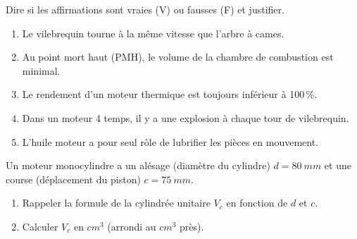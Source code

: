 \documentclass[11pt]{article}
\begin{document}
\begin{exercice}
Dire si les affirmations sont vraies (V) ou fausses (F) et justifier.
\begin{enumerate}
    \item Le vilebrequin tourne à la même vitesse que l'arbre à cames.
    \item Au point mort haut (PMH), le volume de la chambre de combustion est minimal.
    \item Le rendement d'un moteur thermique est toujours inférieur à 100\,\%.
    \item Dans un moteur 4 temps, il y a une explosion à chaque tour de vilebrequin.
    \item L'huile moteur a pour seul rôle de lubrifier les pièces en mouvement.
\end{enumerate}
\end{exercice}

\begin{exercice}
Un moteur monocylindre a un alésage (diamètre du cylindre) $d = \SI{80}{mm}$ et une course (déplacement du piston) $c = \SI{75}{mm}$.
\begin{enumerate}
    \item Rappeler la formule de la cylindrée unitaire $V_c$ en fonction de $d$ et $c$.
    \item Calculer $V_c$ en $\si{cm^3}$ (arrondi au $\si{cm^3}$ près).
\end{enumerate}
\end{exercice}
\end{document}

